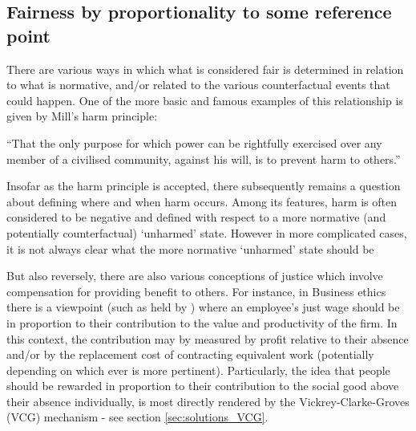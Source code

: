 
\subsection{Fairness by proportionality to some reference point}\label{sec:reference_points}

There are various ways in which what is considered fair is determined in relation to what is normative, and/or related to the various counterfactual events that could happen.
One of the more basic and famous examples of this relationship is given by Mill's harm principle:

\begin{displayquote}
``That the only purpose for which power can be rightfully exercised over any member of a civilised community, against his will, is to prevent harm to others.'' \cite[Chapter 1]{Mill2Gutenberg}
\end{displayquote}

Insofar as the harm principle is accepted, there subsequently remains a question about defining where and when harm occurs.
Among its features, harm is often considered to be negative and defined with respect to a more normative (and potentially counterfactual) `unharmed' state.
However in more complicated cases, it is not always clear what the more normative `unharmed' state should be \DIFdelbegin {}\DIFdelend \DIFaddbegin {}\DIFaddend 

But also reversely, there are also various conceptions of justice which involve compensation for providing benefit to others.
For instance, in Business ethics there is a viewpoint (such as held by \cite{sternberg2000just}) where an employee's just wage should be in proportion to their contribution to the value and productivity of the firm.
In this context, the contribution may by measured by profit relative to their absence and/or by the replacement cost of contracting equivalent work (potentially depending on which ever is more pertinent).
Particularly, the idea that people should be rewarded in proportion to their contribution to the social good above their absence individually, is most directly rendered by the Vickrey-Clarke-Groves (VCG) mechanism - see section \ref{sec:solutions_VCG}.

